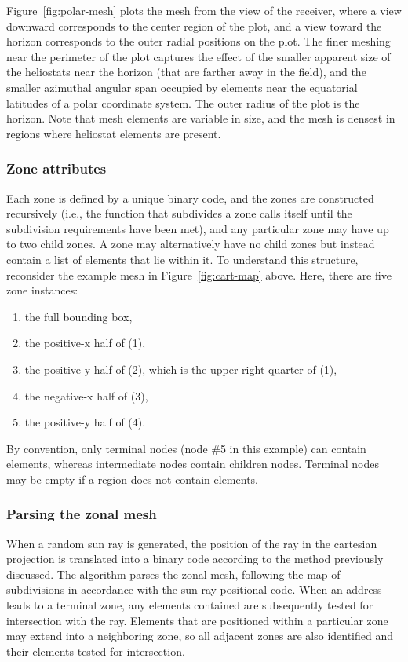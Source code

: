 \documentclass[11pt,letterpaper]{article}
\begin{document}
Figure~\ref{fig:polar-mesh} plots the mesh from the view of the receiver, where a view downward corresponds to the center region of the plot, and a view toward the horizon corresponds to the outer radial positions on the plot. 
The finer meshing near the perimeter of the plot captures the effect of the smaller apparent size of the heliostats near the horizon (that are farther away in the field), and the smaller azimuthal angular span occupied by elements near the equatorial latitudes of a polar coordinate system. The outer radius of the plot is the horizon. 
%
Note that mesh elements are variable in size, and the mesh is densest in regions where heliostat elements are present.

\subsubsection{Zone attributes}
Each zone is defined by a unique binary code, and the zones are constructed recursively (i.e., the function that subdivides a zone calls itself until the subdivision requirements have been met), and any particular zone may have up to two child zones. 
A zone may alternatively have no child zones but instead contain a list of elements that lie within it.
To understand this structure, reconsider the example mesh in Figure~\ref{fig:cart-map} above. 
Here, there are five zone instances: 
\begin{enumerate} 
	\item the full bounding box, 
	\item the positive-x half of (1), 
	\item the positive-y half of (2), which is the upper-right quarter of (1),
	\item the negative-x half of (3),
	\item the positive-y half of (4).
\end{enumerate}

By convention, only terminal nodes (node \#5 in this example) can contain elements, whereas intermediate nodes contain children nodes. 
Terminal nodes may be empty if a region does not contain elements. 


\subsubsection{Parsing the zonal mesh}
When a random sun ray is generated, the position of the ray in the cartesian projection is translated into a binary code according to the method previously discussed. 
The algorithm parses the zonal mesh, following the map of subdivisions in accordance with the sun ray positional code. 
When an address leads to a terminal zone, any elements contained are subsequently tested for intersection with the ray. 
Elements that are positioned within a particular zone may extend into a neighboring zone, so all adjacent zones are also identified and their elements tested for intersection. 
\end{document}
